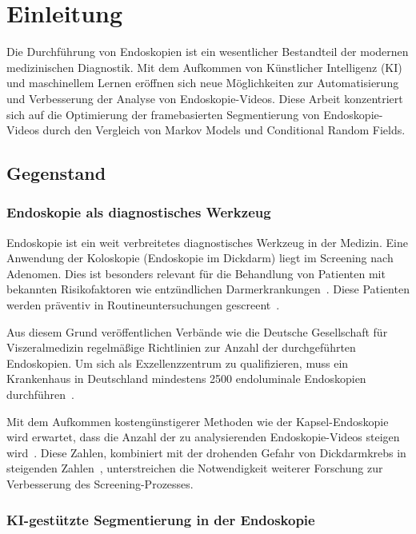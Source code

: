\chapter{Einleitung}\label{ch:introduction}
Die Durchführung von Endoskopien ist ein wesentlicher Bestandteil der modernen medizinischen Diagnostik. Mit dem Aufkommen von Künstlicher Intelligenz (KI) und maschinellem Lernen eröffnen sich neue Möglichkeiten zur Automatisierung und Verbesserung der Analyse von Endoskopie-Videos. Diese Arbeit konzentriert sich auf die Optimierung der framebasierten Segmentierung von Endoskopie-Videos durch den Vergleich von Markov Models und Conditional Random Fields.

\section{Gegenstand}

\subsection{Endoskopie als diagnostisches Werkzeug}

Endoskopie ist ein weit verbreitetes diagnostisches Werkzeug in der Medizin. Eine Anwendung der Koloskopie (Endoskopie im Dickdarm) liegt im Screening nach Adenomen. Dies ist besonders relevant für die Behandlung von Patienten mit bekannten Risikofaktoren wie entzündlichen Darmerkrankungen~\citep{vleggaar-2007}. Diese Patienten werden präventiv in Routineuntersuchungen gescreent~\citep{arnold-2020}.

Aus diesem Grund veröffentlichen Verbände wie die Deutsche Gesellschaft für Viszeralmedizin regelmäßige Richtlinien zur Anzahl der durchgeführten Endoskopien. Um sich als Exzellenzzentrum zu qualifizieren, muss ein Krankenhaus in Deutschland mindestens 2500 endoluminale Endoskopien durchführen~\citep{dgav-ev-2015}.

Mit dem Aufkommen kostengünstigerer Methoden wie der Kapsel-Endoskopie wird erwartet, dass die Anzahl der zu analysierenden Endoskopie-Videos steigen wird~\citep{koulaouzidis-2021}\citep{8903282}. Diese Zahlen, kombiniert mit der drohenden Gefahr von Dickdarmkrebs in steigenden Zahlen~\citep{acs-2024,ferlay-2024}, unterstreichen die Notwendigkeit weiterer Forschung zur Verbesserung des Screening-Prozesses.

\subsection{KI-gestützte Segmentierung in der Endoskopie}

